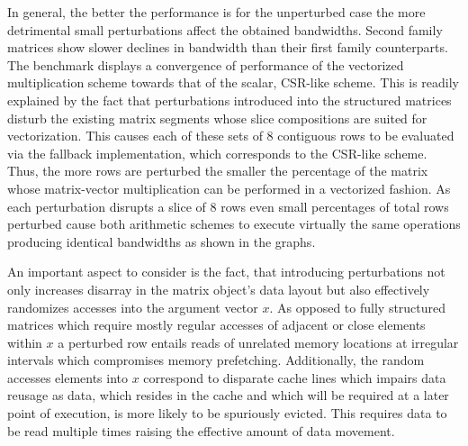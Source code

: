     In general, the better the performance is for the unperturbed case the more detrimental small perturbations affect
    the obtained bandwidths. Second family matrices show slower declines in bandwidth than their first family
    counterparts. The benchmark displays a convergence of performance of the vectorized multiplication scheme towards
    that of the scalar, CSR-like scheme. This is readily explained by the fact that perturbations introduced into the
    structured matrices disturb the existing matrix segments whose slice compositions are suited for vectorization. This
    causes each of these sets of $8$ contiguous rows to be evaluated via the fallback implementation, which corresponds
    to the CSR-like scheme. Thus, the more rows are perturbed the smaller the percentage of the matrix whose
    matrix-vector multiplication can be performed in a vectorized fashion. As each perturbation disrupts a slice of $8$
    rows even small percentages of total rows perturbed cause both arithmetic schemes to execute virtually the same
    operations producing identical bandwidths as shown in the graphs.

    An important aspect to consider is the fact, that introducing perturbations not only increases disarray in the matrix object's
    data layout but also effectively randomizes accesses into the argument vector $x$. As opposed to fully structured
    matrices which require mostly regular accesses of adjacent or close elements within $x$ a perturbed row entails
    reads of unrelated memory locations at irregular intervals which compromises memory prefetching. Additionally, the
    random accesses elements into $x$ correspond to disparate cache lines which impairs data reusage as
    data, which resides in the cache and which will be required at a later point of execution, is more likely to be
    spuriously evicted. This requires data to be read multiple times raising the effective amount of data movement.

